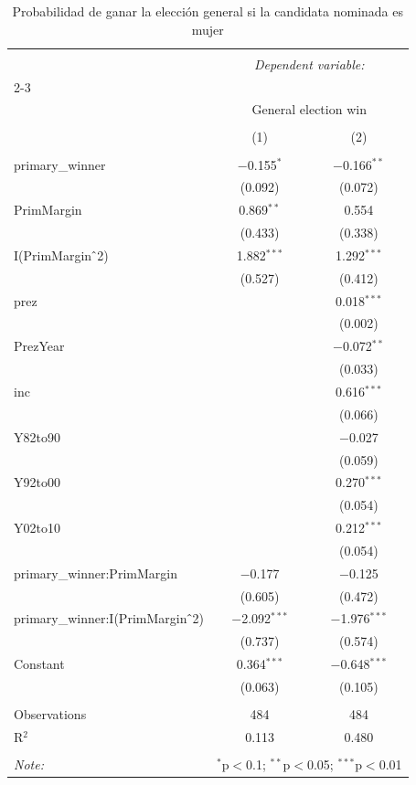 
\begin{table}[!htbp] \centering 
  \caption{Probabilidad de ganar la elección general si la candidata nominada es mujer} 
  \label{} 
\begin{tabular}{@{\extracolsep{5pt}}lcc} 
\\[-1.8ex]\hline 
\hline \\[-1.8ex] 
 & \multicolumn{2}{c}{\textit{Dependent variable:}} \\ 
\cline{2-3} 
\\[-1.8ex] & \multicolumn{2}{c}{General election win} \\ 
\\[-1.8ex] & (1) & (2)\\ 
\hline \\[-1.8ex] 
 primary\_winner & $-$0.155$^{*}$ & $-$0.166$^{**}$ \\ 
  & (0.092) & (0.072) \\ 
  PrimMargin & 0.869$^{**}$ & 0.554 \\ 
  & (0.433) & (0.338) \\ 
  I(PrimMargin$\hat{\mkern6mu}$2) & 1.882$^{***}$ & 1.292$^{***}$ \\ 
  & (0.527) & (0.412) \\ 
  prez &  & 0.018$^{***}$ \\ 
  &  & (0.002) \\ 
  PrezYear &  & $-$0.072$^{**}$ \\ 
  &  & (0.033) \\ 
  inc &  & 0.616$^{***}$ \\ 
  &  & (0.066) \\ 
  Y82to90 &  & $-$0.027 \\ 
  &  & (0.059) \\ 
  Y92to00 &  & 0.270$^{***}$ \\ 
  &  & (0.054) \\ 
  Y02to10 &  & 0.212$^{***}$ \\ 
  &  & (0.054) \\ 
  primary\_winner:PrimMargin & $-$0.177 & $-$0.125 \\ 
  & (0.605) & (0.472) \\ 
  primary\_winner:I(PrimMargin$\hat{\mkern6mu}$2) & $-$2.092$^{***}$ & $-$1.976$^{***}$ \\ 
  & (0.737) & (0.574) \\ 
  Constant & 0.364$^{***}$ & $-$0.648$^{***}$ \\ 
  & (0.063) & (0.105) \\ 
 \hline \\[-1.8ex] 
Observations & 484 & 484 \\ 
R$^{2}$ & 0.113 & 0.480 \\ 
\hline 
\hline \\[-1.8ex] 
\textit{Note:}  & \multicolumn{2}{r}{$^{*}$p$<$0.1; $^{**}$p$<$0.05; $^{***}$p$<$0.01} \\ 
\end{tabular} 
\end{table} 
